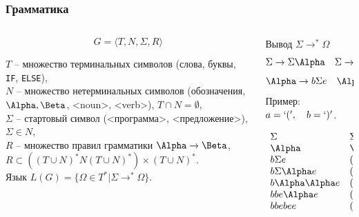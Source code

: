 \documentclass[10pt]{beamer}
\begin{document}
\begin{frame}
  \frametitle{Грамматика}
   \begin{columns}
     \begin{column}{0.6\textwidth}
       \begin{block}{}
       \[
         G=\langle T,N,\Sigma,R\rangle
       \]
     \end{block}
       $T$ -- множество терминальных символов (слова, буквы, \texttt{IF}, \texttt{ELSE}),\\
       $N$ -- множество нетерминальных символов (обозначения, $\Alpha, \Beta$, <noun>, <verb>), $T\cap N=\emptyset,$\\
       $\Sigma$ -- стартовый символ (<программа>, <предложение>), $\Sigma\in N,$\\
       $R$ -- множество правил грамматики $\Alpha\to\Beta$, \\$R\subset((T\cup N)^* N(T \cup N)^*)\times(T\cup N)^*$.\\[0.5em]
       Язык $L(G)=\{\Omega\in T^* | \Sigma\to^*\Omega\}$.
     \end{column}
     \begin{column}{0.4\textwidth}
       \begin{block}{Вывод $\Sigma\to^*\Omega$}
         \[\Sigma\to\Sigma\Alpha\quad \Sigma\to\Alpha\]
         \[\Alpha\to b\Sigma e\quad \Alpha\to be \]
         Пример: \(a=`(',\quad b=`)'\).
         \begin{raggedleft}
           \[
             \begin{array}{ll}
               \Sigma & \Sigma\\
               \Alpha & \Alpha\\
               b\Sigma e & ( \Sigma )\\
               b\Sigma\Alpha e & ( \Sigma\Alpha )\\
               b\Alpha\Alpha e & ( \Alpha\Alpha )\\
               bbe\Alpha e & (() \Alpha )\\
               bbebee & (()())
             \end{array} \]
         \end{raggedleft}
     \end{block}
     \end{column}
   \end{columns}
\end{frame}
\end{document}
